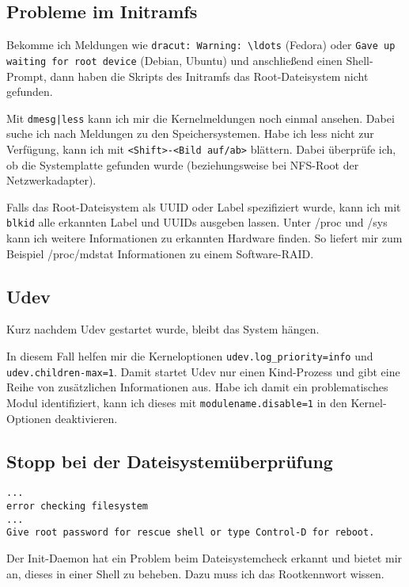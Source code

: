 \subsection{Probleme im Initramfs}

Bekomme ich Meldungen wie \verb?dracut: Warning: \ldots? (Fedora) oder
\verb?Gave up waiting for root device? (Debian, Ubuntu) und anschließend einen
Shell-Prompt, dann haben die Skripts des Initramfs das Root-Dateisystem nicht
gefunden.

Mit \verb?dmesg|less? kann ich mir die Kernelmeldungen noch einmal ansehen.
Dabei suche ich nach Meldungen zu den Speichersystemen. Habe ich less nicht
zur Verfügung, kann ich mit \verb?<Shift>-<Bild auf/ab>? blättern. Dabei
überprüfe ich, ob die Systemplatte gefunden wurde (beziehungsweise bei
NFS-Root der Netzwerkadapter).

Falls das Root-Dateisystem als UUID oder Label spezifiziert wurde, kann ich
mit \verb?blkid? alle erkannten Label und UUIDs ausgeben lassen. Unter /proc
und /sys kann ich weitere Informationen zu erkannten Hardware finden. So
liefert mir zum Beispiel /proc/mdstat Informationen zu einem Software-RAID.

\subsection{Udev}

Kurz nachdem Udev gestartet wurde, bleibt das System hängen.

In diesem Fall helfen mir die Kerneloptionen \verb?udev.log_priority=info? und
\verb?udev.children-max=1?. Damit startet Udev nur einen Kind-Prozess und gibt
eine Reihe von zusätzlichen Informationen aus. Habe ich damit ein
problematisches Modul identifiziert, kann ich dieses mit
\verb?modulename.disable=1? in den Kernel-Optionen deaktivieren.

\subsection{Stopp bei der Dateisystemüberprüfung}

\begin{verbatim}
...
error checking filesystem
...
Give root password for rescue shell or type Control-D for reboot.
\end{verbatim}

Der Init-Daemon hat ein Problem beim Dateisystemcheck erkannt und bietet mir
an, dieses in einer Shell zu beheben. Dazu muss ich das Rootkennwort wissen.


